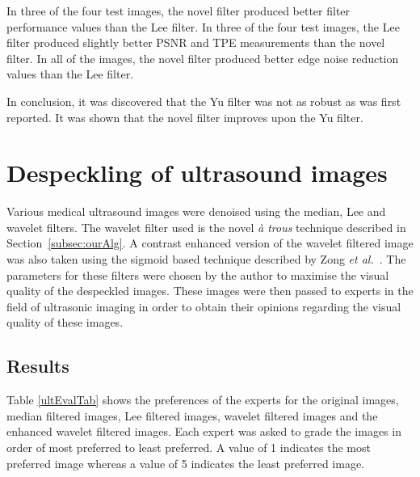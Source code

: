 \documentclass[12pt]{report}
\begin{document}
In three of the four test images, the novel filter produced better filter performance values than the Lee filter.
In three of the four test images, the Lee filter produced slightly better PSNR and TPE measurements than the novel filter.
In all of the images, the novel filter produced better edge noise reduction values than the Lee filter.

In conclusion, it was discovered that the Yu filter was not as robust as was first reported.
It was shown that the novel filter improves upon the Yu filter.

\section{Despeckling of ultrasound images}
Various medical ultrasound images were denoised using the median, Lee and wavelet filters.
The wavelet filter used is the novel \emph{\`a trous} technique described in Section~\ref{subsec:ourAlg}.
A contrast enhanced version of the wavelet filtered image was also taken using the sigmoid 
based technique described by Zong \emph{et al.}~\cite{zong98}.
The parameters for these filters were chosen by the author to maximise the visual quality of the 
despeckled images. These images were then passed to experts in the field of ultrasonic imaging in
order to obtain their opinions regarding the visual quality of these images. 

\subsection{Results}
Table \ref{ultEvalTab} shows the
preferences of the experts for the original images, median filtered images, Lee
filtered images, wavelet filtered images and the enhanced wavelet filtered images. 
Each expert was asked to grade the images in order of most preferred to least preferred.
A value of 1 indicates the most preferred image
whereas a value of 5 indicates the least preferred image. 
\end{document}
